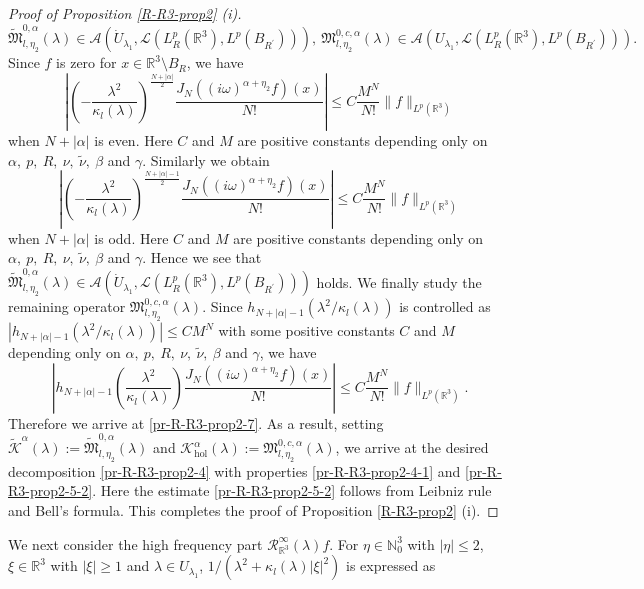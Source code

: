 \documentclass[dvipdfmx,12pt]{article}
\begin{document}
\begin{proof}[Proof of Proposition \ref{R-R3-prop2} {\rm (i)}]
\begin{equation}
\widetilde{\mathfrak{M} }_{l,\eta_2}^{0,\alpha}(\lambda)\in \mathcal{A}(\Dot{U}_{\lambda_1},\mathcal{L}(L_R^p(\mathbb{R}^3), L^p(B_{R^\prime}))),~\mathfrak{M}_{l,\eta_2}^{0,c,\alpha}(\lambda)\in \mathcal{A}(U_{\lambda_1},\mathcal{L}(L_R^p(\mathbb{R}^3), L^p(B_{R^\prime}))).
\end{equation}
Since $f$ is zero for $x\in \mathbb{R}^3\setminus B_R$, we have
\[
\left| \left(-\frac{\lambda^2}{\kappa_l(\lambda)} \right)^{\frac{N+|\alpha|}{2} }\frac{J_N( (i\omega)^{\alpha+\eta_2}  f)(x)}{N !}\right|\leq C\frac{M^N}{N!}\|f\|_{L^p(\mathbb{R}^3)}
\]
when $N+|\alpha|$ is even. Here $C$ and $M$ are positive constants depending only on $\alpha,~p,~R,~\nu,~\tilde{\nu},~\beta$ and $\gamma$. Similarly we obtain
\[
\left| \left(-\frac{\lambda^2}{\kappa_l(\lambda)} \right)^{\frac{N+|\alpha|-1}{2} }\frac{J_N( (i\omega)^{\alpha+\eta_2}  f)(x)}{N !}\right|\leq C\frac{M^N}{N!}\|f\|_{L^p(\mathbb{R}^3)}
\]
when $N+|\alpha|$ is odd.  Here $C$ and $M$ are positive constants depending only on $\alpha,~p,~R,~\nu,~\tilde{\nu},~\beta$ and $\gamma$. Hence we see that $\widetilde{\mathfrak{M} }_{l,\eta_2}^{0,\alpha}(\lambda)\in \mathcal{A}(\Dot{U}_{\lambda_1},\mathcal{L}(L_R^p(\mathbb{R}^3), L^p(B_{R^\prime})))$ holds. We finally study the remaining operator $\mathfrak{M}_{l,\eta_2}^{0,c,\alpha}(\lambda)$. Since $h_{N+|\alpha|-1}(\lambda^2/\kappa_l(\lambda))$ is controlled as $|h_{N+|\alpha|-1}(\lambda^2/\kappa_l(\lambda))|\leq  C M^N$ with some positive constants $C$ and $M$ depending only on $\alpha,~p,~R,~\nu,~\tilde{\nu},~\beta$ and $\gamma$, we have
\[
\left| h_{N+|\alpha|-1}\left(\frac{\lambda^2}{\kappa_l(\lambda)} \right)\frac{J_N( (i\omega)^{\alpha+\eta_2}  f)(x)}{N !}\right|\leq C\frac{M^N}{N!}\|f\|_{L^p(\mathbb{R}^3)}.
\]
Therefore we arrive at \eqref{pr-R-R3-prop2-7}. As a result, setting $\widetilde{\mathcal{K}}^\alpha(\lambda):=\widetilde{\mathfrak{M} }_{l,\eta_2}^{0,\alpha}(\lambda)$ and $\mathcal{K}_{\mathrm{hol}}^\alpha(\lambda):=\mathfrak{M}_{l,\eta_2}^{0,c,\alpha}(\lambda)$, we arrive at the desired decomposition \eqref{pr-R-R3-prop2-4} with properties \eqref{pr-R-R3-prop2-4-1} and \eqref{pr-R-R3-prop2-5-2}. Here the estimate \eqref{pr-R-R3-prop2-5-2} follows from Leibniz rule and Bell's formula. This completes the proof of Proposition \ref{R-R3-prop2} (i).
\end{proof}
We next consider the high frequency part $\mathcal{R}_{\mathbb{R}^3}^\infty(\lambda)f$.  For $\eta\in \mathbb{N}_0^3$ with $|\eta|\le 2$, $\xi\in\mathbb{R}^3$ with $|\xi|\ge1$ and $\lambda\in U_{\lambda_1}$, $1/(\lambda^2+\kappa_l(\lambda)|\xi|^2)$ is expressed as 
\end{document}
